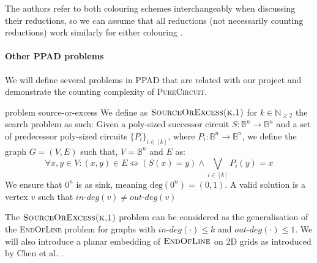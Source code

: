 The authors refer to both colouring schemes interchangeably when discussing their reductions,
so we can assume that all reductions (not necessarily counting reductions) work similarly for either colouring
\cite{chen_SettlingComplexityComputing_2009, deligkas_PureCircuitTightInapproximability_2024, daskalakis_ComplexityComputingNash_2006, chen_Complexity2DDiscrete_2009}.



\paragraph{Other PPAD problems}

We will define several problems in \textsc{PPAD} that are related with our project
and demonstrate the counting complexity of \textsc{PureCircuit}.

\begin{definitionbox}{ problem \cite{ikenmeyer_WhatWhatNot_2022}}{source-or-excess}
	We define as $\textsc{SourceOrExcess(k,1)}$ for $k \in \mathbb{N}_{\geq 2}$
	the search problem as such: Given a poly-sized successor circuit $S : \mathbb{B}^n \to \mathbb{B}^n$
	and a set of predecessor poly-sized circuits $\{P_i\}_{i \in [k]}$, where $P_i : \mathbb{B}^n \to \mathbb{B}^n$, we define
	the graph $G = (V,E)$ such that, $V = \mathbb{B}^n$ and $E$ as:
	$$
		\forall x, y \in V: (x,y) \in E \iff (S(x) = y) \wedge \bigvee_{i \in [k]} P_i(y) = x
	$$
	We ensure that $0^n$ is as sink, meaning $\text{deg}(0^n) = (0,1)$.
	A valid solution is a vertex $v$ such that $\textit{in-deg}(v) \neq \textit{out-deg}(v)$
\end{definitionbox}

The $\textsc{SourceOrExcess(k,1)}$ problem can be considered as the generalisation of the \textsc{EndOfLine}
problem for graphs with $\textit{in-deg}(\cdot) \leq k$ and $\textit{out-deg}(\cdot) \leq 1$.
We will also introduce a planar embedding of $\textnormal{\textsc{EndOfLine}}$ on 2D grids as introduced
by Chen et al. \cite{chen_Complexity2DDiscrete_2009}. 

